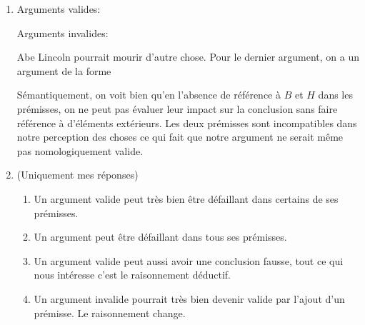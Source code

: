 \documentclass[fleqn,a4paper,nobib]{tufte-handout}
\begin{document}
\begin{enumerate}[label=\textbf{\Alph*.}]
    \item Arguments valides:

    Arguments invalides:

    Abe Lincoln pourrait mourir d'autre chose.
    Pour le dernier argument, on a un argument de la forme

    Sémantiquement, on voit bien qu'en l'absence de référence à $B$ et $H$
    dans les prémisses, on ne peut pas évaluer leur impact sur la conclusion
    sans faire référence à d'éléments extérieurs. Les deux prémisses
    sont incompatibles dans notre perception des choses ce qui fait que
    notre argument ne serait même pas nomologiquement valide.

    \item (Uniquement mes réponses)
    
    \begin{enumerate}[label=\arabic*.]
        \item Un argument valide peut très bien être défaillant dans
        certains de ses prémisses.
        \item Un argument peut être défaillant dans tous ses prémisses.
        \item Un argument valide peut aussi avoir une conclusion fausse, tout
        ce qui nous intéresse c'est le raisonnement déductif.
        \item Un argument invalide pourrait très bien devenir valide par
        l'ajout d'un prémisse. Le raisonnement change.
    \end{enumerate}
\end{enumerate}
\end{document}
